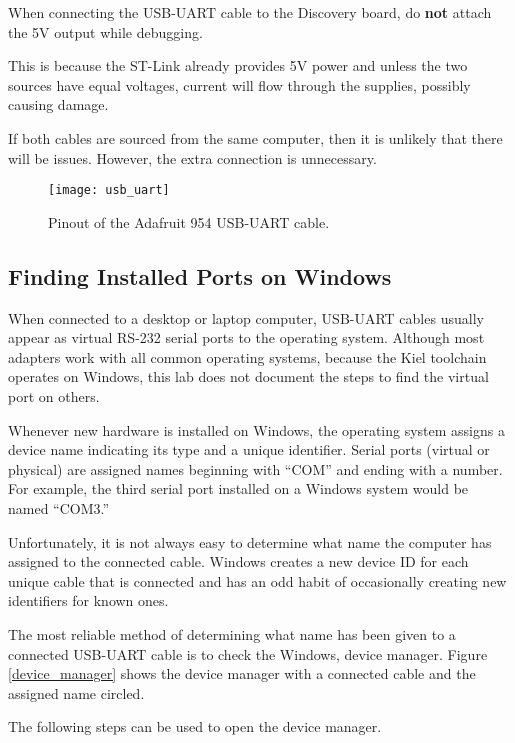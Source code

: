 \documentclass[openany,11pt,fleqn]{book} %
\begin{document}
\begin{warning}
When connecting the USB-UART cable to the Discovery board, do \textbf{not} attach the 5V output while debugging. 

This is because the ST-Link already provides 5V power and unless the two sources have equal voltages, current will flow through the supplies, possibly causing damage. 

If both cables are sourced from the same computer, then it is unlikely that there will be issues. However, the extra connection is unnecessary.
\end{warning}

\begin{figure}[]
    \centering\texttt{[image: usb\_uart]}
    \caption{Pinout of the Adafruit 954 USB-UART cable.}
    \label{usb_uart}
\end{figure}

\subsection{Finding Installed Ports on Windows}
When connected to a desktop or laptop computer, USB-UART cables usually appear as virtual RS-232 serial ports to the operating system. Although most adapters work with all common operating systems, because the Kiel toolchain operates on Windows, this lab does not document the steps to find the virtual port on others. 

Whenever new hardware is installed on Windows, the operating system assigns a device name indicating its type and a unique identifier. Serial ports (virtual or physical) are assigned names beginning with ``COM'' and ending with a number. For example, the third serial port installed on a Windows system would be named ``COM3.''

Unfortunately, it is not always easy to determine what name the computer has assigned to the connected cable. Windows creates a new device ID for each unique cable that is connected and has an odd habit of occasionally creating new identifiers for known ones. 

The most reliable method of determining what name has been given to a connected USB-UART cable is to check the Windows, device manager. Figure \ref{device_manager} shows the device manager with a connected cable and the assigned name circled. 

The following steps can be used to open the device manager.
\end{document}
